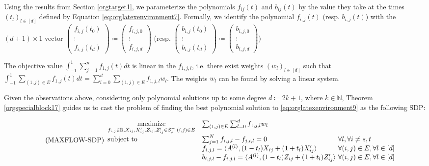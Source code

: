 \documentclass[moor]{informs1}
\begin{document}
Using the results from Section \ref{orgtarget1}, we parameterize the polynomials \(f_{ij}(t)\) and \(b_{ij}(t)\) by the value they take at the times \((t_l)_{l \in [d]}\) defined by Equation \ref{eq:orglatexenvironment7}. Formally, we identify the polynomial \(f_{i,j}(t)\) (resp. \(b_{i,j}(t)\))  with the \((d+1) \times 1\) vector \(\begin{pmatrix}f_{i,j}(t_0)\\\vdots\\f_{i,j}(t_d)\end{pmatrix} \coloneqq \begin{pmatrix}f_{i,j,0}\\\vdots\\f_{i,j,d}\end{pmatrix}\) (resp. \(\begin{pmatrix}b_{i,j}(t_0)\\\vdots\\b_{i,j}(t_d)\end{pmatrix} \coloneqq \begin{pmatrix}b_{i,j,0}\\\vdots\\b_{i,j,d}\end{pmatrix}\))

The objective value \(\int_{-1}^1  \sum_{j=1}^n f_{1,j}(t) dt\) is linear in the \(f_{1,j,l}\), i.e. there exist weights \((w_l)_{l \in [d]}\) such that \(\int_{-1}^1  \sum_{(1,j) \in E} f_{1,j}(t) dt = \sum_{l=0}^d \sum_{(1,j) \in E}  f_{1,j,l} w_l\). The weights \(w_l\) can be found by solving a linear system.

Given the observations above, considering only polynomial solutions up to some degree \(d \coloneqq 2k+1\), where \(k \in \mathbb N\), Theorem \ref{orgspecialblock17} guides us to cast the problem of finding the best polynomial solution to  \ref{eq:orglatexenvironment9} as the following SDP:

\begin{equation*}
\label{eq:orglatexenvironment10}
\tag{MAXFLOW-SDP}
\begin{array}{ll@{}ll}
\underset{f_{i,j} \in \mathbb R,  X_{ij}, X'_{ij}, Z_{ij}, Z'_{ij} \in S_k^+ \; (i, j) \in E}{\text{maximize}}
& \sum_{(1,j) \in E} \sum_{l=0}^d f_{1,j,l} w_l \\
\text{subject to}
& \sum_{j=1}^N f_{i,j,l} - f_{j,i,l} = 0  & \forall l, \forall i \ne s, t \\
& f_{i,j,l}                          = \langle A^{(l)}, (1-t_l) X_{ij} + (1+t_l) X'_{ij} \rangle  &\forall (i,j) \in E, \forall l \in [d]\\
& b_{i,j,l} - f_{i,j,l}              = \langle A^{(l)}, (1-t_l) Z_{ij} + (1+t_l) Z'_{ij} \rangle\ &\forall (i,j) \in E, \forall l \in [d] \\
\end{array}
\end{equation*}
\end{document}

